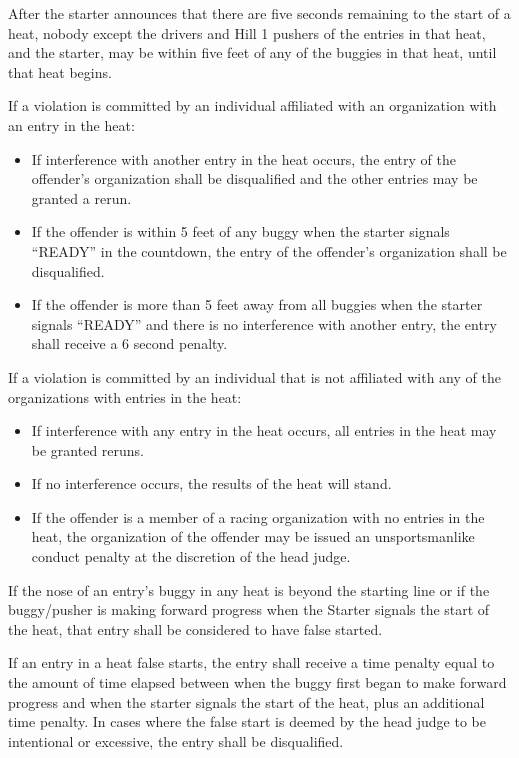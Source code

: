 After the starter announces that there are five seconds remaining to the start of a heat, nobody except the drivers and Hill 1 pushers of the entries in that heat, and the starter, may be within five feet of any of the buggies in that heat, until that heat begins.

If a violation is committed by an individual affiliated with an organization with an entry in the heat:
    \begin{itemize}
    \item If interference with another entry in the heat occurs, the entry of the offender’s organization shall be disqualified and the other entries may be granted a rerun.
    \item If the offender is within 5 feet of any buggy when the starter signals “READY” in the countdown, the entry of the offender’s organization shall be disqualified.
    \item If the offender is more than 5 feet away from all buggies when the starter signals “READY” and there is no interference with another entry, the entry shall receive a 6 second penalty.
    \end{itemize}

If a violation is committed by an individual that is not affiliated with any of the organizations with entries in the heat:
\begin{itemize}
    \item If interference with any entry in the heat occurs, all entries in the heat may be granted reruns.
    \item If no interference occurs, the results of the heat will stand.
    \item If the offender is a member of a racing organization with no entries in the heat, the organization of the offender may be issued an unsportsmanlike conduct penalty at the discretion of the head judge.
\end{itemize}



	If the nose of an entry’s buggy in any heat is beyond the starting line or if the buggy/pusher is making forward progress when the Starter signals the start of the heat, that entry shall be considered to have false started. 

    If an entry in a heat false starts, the entry shall receive a time penalty equal to the amount of time elapsed between when the buggy first began to make forward progress and when the starter signals the start of the heat, plus an additional time penalty. In cases where the false start is deemed by the head judge to be intentional or excessive, the entry shall be disqualified.

